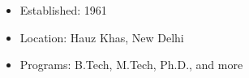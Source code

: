 
\begin{itemize}
    \item Established: 1961
    \item Location: Hauz Khas, New Delhi
    \item Programs: B.Tech, M.Tech, Ph.D., and more
\end{itemize}
